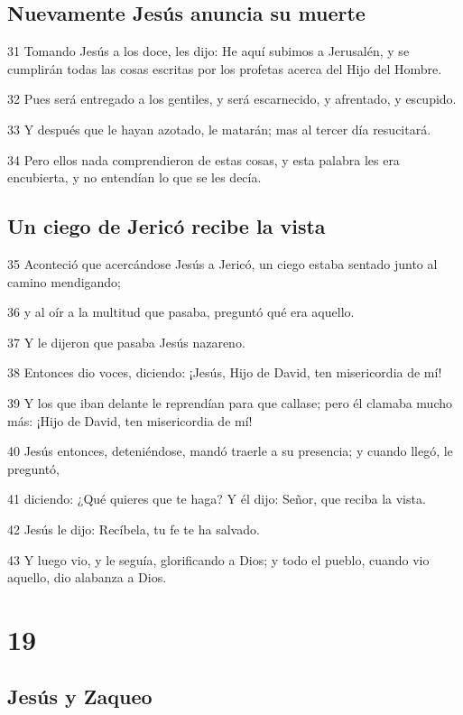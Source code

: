 \section*{Nuevamente Jesús anuncia su muerte}

\par 31 Tomando Jesús a los doce, les dijo: He aquí subimos a Jerusalén, y se cumplirán todas las cosas escritas por los profetas acerca del Hijo del Hombre.
\par 32 Pues será entregado a los gentiles, y será escarnecido, y afrentado, y escupido.
\par 33 Y después que le hayan azotado, le matarán; mas al tercer día resucitará.
\par 34 Pero ellos nada comprendieron de estas cosas, y esta palabra les era encubierta, y no entendían lo que se les decía.

\section*{Un ciego de Jericó recibe la vista}

\par 35 Aconteció que acercándose Jesús a Jericó, un ciego estaba sentado junto al camino mendigando;
\par 36 y al oír a la multitud que pasaba, preguntó qué era aquello.
\par 37 Y le dijeron que pasaba Jesús nazareno.
\par 38 Entonces dio voces, diciendo: ¡Jesús, Hijo de David, ten misericordia de mí!
\par 39 Y los que iban delante le reprendían para que callase; pero él clamaba mucho más: ¡Hijo de David, ten misericordia de mí!
\par 40 Jesús entonces, deteniéndose, mandó traerle a su presencia; y cuando llegó, le preguntó,
\par 41 diciendo: ¿Qué quieres que te haga? Y él dijo: Señor, que reciba la vista.
\par 42 Jesús le dijo: Recíbela, tu fe te ha salvado.
\par 43 Y luego vio, y le seguía, glorificando a Dios; y todo el pueblo, cuando vio aquello, dio alabanza a Dios.

\chapter{19}

\section*{Jesús y Zaqueo}

